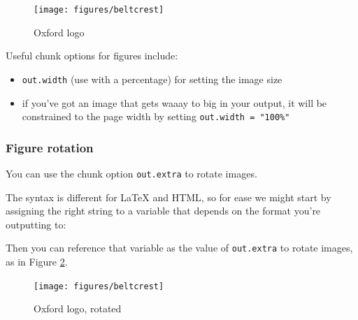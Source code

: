 \documentclass[a4paper, twoside]{templates/ociamthesis}
\providecommand{\tightlist}{%
  \setlength{\itemsep}{0pt}\setlength{\parskip}{0pt}}
\newenvironment{Shaded}{\begin{snugshade}}{\end{snugshade}}
\newcommand{\ControlFlowTok}[1]{\textcolor[rgb]{0.13,0.29,0.53}{\textbf{#1}}}
\newcommand{\KeywordTok}[1]{\textcolor[rgb]{0.13,0.29,0.53}{\textbf{#1}}}
\newcommand{\NormalTok}[1]{#1}
\newcommand{\OperatorTok}[1]{\textcolor[rgb]{0.81,0.36,0.00}{\textbf{#1}}}
\newcommand{\StringTok}[1]{\textcolor[rgb]{0.31,0.60,0.02}{#1}}
\renewenvironment{Shaded}
{
  \vspace{4pt}%
  \begin{snugshade}%
}{%
  \end{snugshade}%
  \vspace{4pt}%
}
\begin{document}
\begin{figure}

{\centering \texttt{[image: figures/beltcrest]} 

}

\caption{Oxford logo}\label{fig:oxford-logo}
\end{figure}

Useful chunk options for figures include:

\begin{itemize}
\tightlist
\item
  \texttt{out.width} (use with a percentage) for setting the image size
\item
  if you've got an image that gets waaay to big in your output, it will be constrained to the page width by setting \texttt{out.width\ =\ "100\%"}
\end{itemize}

\hypertarget{figure-rotation}{%
\subsubsection*{Figure rotation}\label{figure-rotation}}

You can use the chunk option \texttt{out.extra} to rotate images.

The syntax is different for LaTeX and HTML, so for ease we might start by assigning the right string to a variable that depends on the format you're outputting to:

\begin{Shaded}
\end{Shaded}

Then you can reference that variable as the value of \texttt{out.extra} to rotate images, as in Figure \ref{fig:oxford-logo-rotated}.

\begin{figure}

{\centering \texttt{[image: figures/beltcrest]} 

}

\caption{Oxford logo, rotated}\label{fig:oxford-logo-rotated}
\end{figure}
\end{document}
